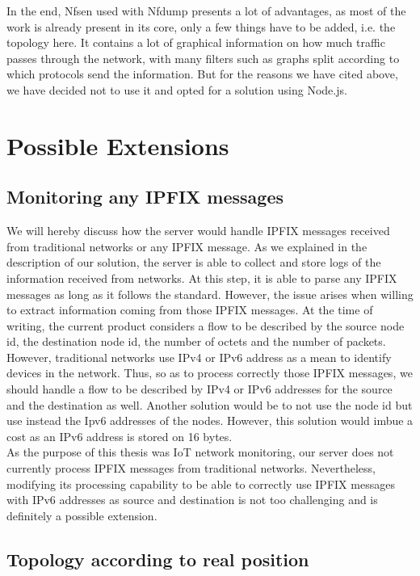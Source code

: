 In the end, Nfsen used with Nfdump presents a lot of advantages, as most of the work is already present in its core, only a few things have to be added, i.e. the topology here. It contains a lot of graphical information on how much traffic passes through the network, with many filters such as graphs split according to which protocols send the information. But for the reasons we have cited above, we have decided not to use it and opted for a solution using Node.js.

\section{Possible Extensions}

\subsection*{Monitoring any IPFIX messages}

We will hereby discuss how the server would handle IPFIX messages received from traditional networks or any IPFIX message. As we explained in the description of our solution, the server is able to collect and store logs of the information received from networks. At this step, it is able to parse any IPFIX messages as long as it follows the standard. However, the issue arises when willing to extract information coming from those IPFIX messages. At the time of writing, the current product considers a flow to be described by the source node id, the destination node id, the number of octets and the number of packets. However, traditional networks use IPv4 or IPv6 address as a mean to identify devices in the network. Thus, so as to process correctly those IPFIX messages, we should handle a flow to be described by IPv4 or IPv6 addresses for the source and the destination as well. Another solution would be to not use the node id but use instead the Ipv6 addresses of the nodes. However, this solution would imbue a cost as an IPv6 address is stored on 16 bytes. \\

As the purpose of this thesis was IoT network monitoring, our server does not currently process IPFIX messages from traditional networks. Nevertheless, modifying its processing capability to be able to correctly use IPFIX messages with IPv6 addresses as source and destination is not too challenging and is definitely a possible extension. \\

\subsection*{Topology according to real position}


